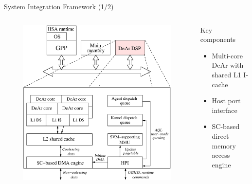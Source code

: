 \documentclass{beamer}
\begin{document}
\begin{CJK}{UTF8}{bkai}
    \begin{frame}{System Integration Framework (1/2)}
        \begin{columns}
            \begin{column}{0.6\textwidth}
                \begin{figure}[!ht] 
                    \centering
                    \includegraphics[width=1.0\textwidth]{./figs/archi.eps}
                    \label{fig:archi}
                \end{figure}
            \end{column}
            \begin{column}{0.40\textwidth}
                \begin{block}{Key components}
                    \begin{itemize}
                        \item Multi-core DeAr with shared L1 I-cache~\cite{kelly2004shared}
                        \item Host port interface~\cite{hpi}
                        \item SC-based direct memory access engine~\cite{sc}
                    \end{itemize}
                \end{block}
            \end{column}
        \end{columns}
    \end{frame}


\end{CJK}
\end{document}

